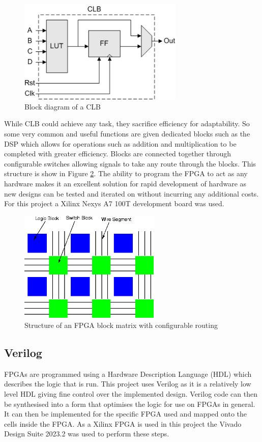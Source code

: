 \begin{figure}[h]
	\centering
	\includegraphics[width=0.7\textwidth]{CLB_Block_Diagram.png}
	\caption{Block diagram of a CLB \cite{FPGAKEY}}
	\label{fig:CLB}
\end{figure}

While CLB could achieve any task, they sacrifice efficiency for adaptability. So some very common and useful functions are given dedicated blocks such as the DSP which allows for operations such as addition and multiplication to be completed with greater efficiency. Blocks are connected together through configurable switches allowing signals to take any route through the blocks. This structure is show in Figure \ref{fig:FPGASTRUCT}.
\newpage
The ability to program the FPGA to act as any hardware makes it an excellent solution for rapid development of hardware as new designs can be tested and iterated on without incurring any additional costs. For this project a Xilinx Nexys A7 100T development board was used.

\begin{figure}[H]
	\centering
	\includegraphics[width=0.6\textwidth]{fpgastruct.png}
	\caption{Structure of an FPGA block matrix with configurable routing \cite{FPGAARCH}}
	\label{fig:FPGASTRUCT}
\end{figure}

\subsection{Verilog}
FPGAs are programmed using a Hardware Description Language (HDL) which describes the logic that is run. This project uses Verilog as it is a relatively low level HDL giving fine control over the implemented design. Verilog code can then be synthesised into a form that optimises the logic for use on FPGAs in general. It can then be implemented for the specific FPGA used and mapped onto the cells inside the FPGA. As a Xilinx FPGA is used in this project the Vivado Design Suite 2023.2 was used to perform these steps.

